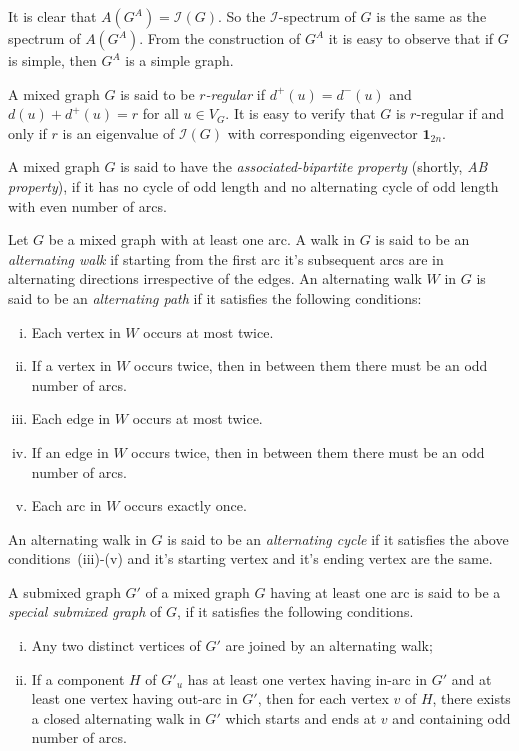 \documentclass[12pt]{article}
\numberwithin{equation}{section}
\newtheorem{defn}{Definition}[section]
\begin{document}
	
	It is clear that $A(G^A)=\mathcal{I}(G)$. So the $\mathcal{I}$-spectrum of $G$ is the same as the spectrum of $A(G^A)$. From the construction of $G^A$ it is easy to observe that if $G$ is simple, then $G^A$ is a simple graph.
	
	A mixed graph $G$ is said to be \textit{$r$-regular} if $d^+(u)=d^-(u)$ and $d(u)+d^+(u)=r$ for all $u\in V_G$. It is easy to verify that $G$ is $r$-regular if and only if $r$ is an eigenvalue of $\mathcal{I}(G)$ with corresponding eigenvector $\boldsymbol{1}_{2n}$.


		A mixed graph $G$ is said to have the \textit{associated-bipartite property} (shortly, \textit{AB property}), if it has no cycle of odd length and no alternating cycle of odd length with even number of arcs.


	
		Let $G$ be a mixed graph with at least one arc. A walk in $G$ is said to be an \textit{alternating walk} if starting from the first arc it's subsequent arcs are in alternating directions irrespective of the edges. 
	An alternating walk $W$ in $G$ is said to be an \textit{alternating path} if it satisfies the following conditions:
		\begin{enumerate}[(i)]
			\item Each vertex in $W$ occurs at most twice.
			\item If a vertex in $W$ occurs twice, then in between them there must be an odd number of arcs.
			\item Each edge in $W$ occurs at most twice.
			\item If an edge in $W$ occurs twice, then in between them there must be an odd number of arcs. 
			\item Each arc in $W$ occurs exactly once.
		\end{enumerate}
		An alternating walk in $G$ is said to be an \textit{alternating cycle} if it satisfies the above conditions~(iii)-(v) and it's starting vertex and it's ending vertex are the same.

		A submixed graph $G'$ of a mixed graph $G$ having at least one arc is said to be a \textit{special submixed graph} of $G$, if it satisfies the following conditions.
		\begin{enumerate}[(i)]
			\item Any two distinct vertices of $G'$ are joined by an alternating walk;
			\item If a component $H$ of $G'_u$ has at least one vertex having in-arc in $G'$ and at least one vertex having out-arc in $G'$, then for each vertex $v$ of $H$, there exists a closed alternating walk in $G'$ which starts and ends at $v$ and containing odd number of arcs.
		\end{enumerate}
\end{document}

